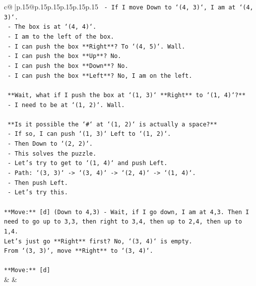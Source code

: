 \documentclass{article}
\begin{document}
{\begin{supertabular}{c@{$\;$}|p{.15\linewidth}@{}p{.15\linewidth}p{.15\linewidth}p{.15\linewidth}p{.15\linewidth}p{.15\linewidth}}
{{{\texttt{    {-}   If I move Down to `(4, 3)`, I am at `(4, 3)`.} \\
\texttt{    {-}   The box is at `(4, 4)`.} \\
\texttt{    {-}   I am to the left of the box.} \\
\texttt{    {-}   I can push the box **Right**? To `(4, 5)`. Wall.} \\
\texttt{    {-}   I can push the box **Up**? No.} \\
\texttt{    {-}   I can push the box **Down**? No.} \\
\texttt{    {-}   I can push the box **Left**? No, I am on the left.} \\
\\ 
\texttt{    **Wait, what if I push the box at `(1, 3)` **Right** to `(1, 4)`?**} \\
\texttt{    {-}   I need to be at `(1, 2)`. Wall.} \\
\\ 
\texttt{    **Is it possible the `\#` at `(1, 2)` is actually a space?**} \\
\texttt{    {-}   If so, I can push `(1, 3)` Left to `(1, 2)`.} \\
\texttt{    {-}   Then Down to `(2, 2)`.} \\
\texttt{    {-}   This solves the puzzle.} \\
\texttt{    {-}   Let's try to get to `(1, 4)` and push Left.} \\
\texttt{    {-}   Path: `(3, 3)` {-}> `(3, 4)` {-}> `(2, 4)` {-}> `(1, 4)`.} \\
\texttt{    {-}   Then push Left.} \\
\texttt{    {-}   Let's try this.} \\
\\ 
\texttt{**Move:** {[}d{]} (Down to 4,3) {-} Wait, if I go down, I am at 4,3. Then I need to go up to 3,3, then right to 3,4, then up to 2,4, then up to 1,4.} \\
\texttt{Let's just go **Right** first? No, `(3, 4)` is empty.} \\
\texttt{From `(3, 3)`, move **Right** to `(3, 4)`.} \\
\\ 
\texttt{**Move:** {[}d{]}} \\
            }
        }
    }
    & & \\ \\


\end{supertabular}}
\end{document}
